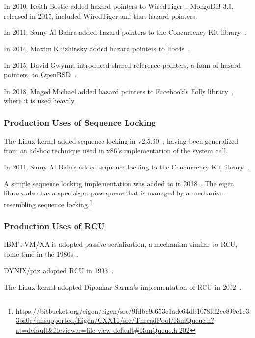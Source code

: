 In 2010, Keith Bostic added hazard pointers to
WiredTiger~\cite{KeithBostic2010WiredTigerhazptr}.
MongoDB 3.0, released in 2015, included WiredTiger and thus hazard pointers.

In 2011, Samy Al Bahra added hazard pointers to the Concurrency Kit
library~\cite{SamyAlBahra2011ckhp}.

In 2014, Maxim Khizhinsky added hazard pointers to
libcds~\cite{MaximKhizhinsky2014libcdsHazptr}.

In 2015, David Gwynne introduced shared reference pointers, a form
of hazard pointers, to OpenBSD~\cite{DavidGwynne2015srp}.

In 2018, Maged Michael added hazard pointers to Facebook's Folly
library~\cite{MagedMichael2018FollyHazptr}, where it is used heavily.

\subsubsection{Production Uses of Sequence Locking}
\label{sec:defer:Production Uses of Sequence Locking}

The Linux kernel added sequence locking in
v2.5.60~\cite{JonathanCorbet2003seqlock}, having been generalized from
an ad-hoc technique used in x86's implementation of the
 system call.

In 2011, Samy Al Bahra added sequence locking to the Concurrency Kit
library~\cite{SamyAlBahra2011ckseqlock}.

A simple sequence locking implementation was added to 
in 2018~\cite{DavidGoldblatt2018seqlock}.
The eigen library also has a special-purpose queue that is managed by
a mechanism resembling sequence locking.\footnote{
	\url{https://bitbucket.org/eigen/eigen/src/9fdbc9e653c1adc64db1078fd2ec899c1e33ba0c/unsupported/Eigen/CXX11/src/ThreadPool/RunQueue.h?at=default&fileviewer=file-view-default\#RunQueue.h-202}}

\subsubsection{Production Uses of RCU}
\label{sec:defer:Production Uses of RCU}

IBM's VM/XA is adopted passive serialization, a mechanism similar to
RCU, some time in the 1980s~\cite{Hennessy89}.

DYNIX/ptx adopted RCU in 1993~\cite{McKenney98,Slingwine95}.

The Linux kernel adopted Dipankar Sarma's implementation of RCU in
2002~\cite{Torvalds2.5.43}.


